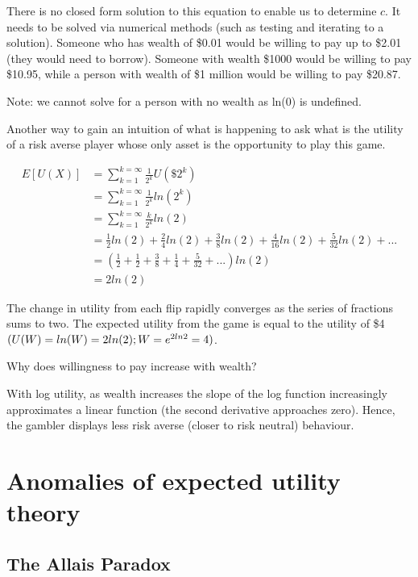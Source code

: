 \documentclass[
  letterpaper,
  DIV=11,
  numbers=noendperiod]{scrreprt}
\begin{document}
There is no closed form solution to this equation to enable us to
determine \(c\). It needs to be solved via numerical methods (such as
testing and iterating to a solution). Someone who has wealth of \$0.01
would be willing to pay up to \$2.01 (they would need to borrow).
Someone with wealth \$1000 would be willing to pay \$10.95, while a
person with wealth of \$1 million would be willing to pay \$20.87.

Note: we cannot solve for a person with no wealth as ln⁡(0) is undefined.

Another way to gain an intuition of what is happening to ask what is the
utility of a risk averse player whose only asset is the opportunity to
play this game.

\begin{align*}
E[U(X)]&=\sum_{k=1}^{k=\infty}\frac{1}{2^k}U(\$2^k) \\[12pt]
&=\sum_{k=1}^{k=\infty}\frac{1}{2^k}ln(2^k) \\[12pt]
&=\sum_{k=1}^{k=\infty}\frac{k}{2^k}ln(2) \\[12pt]
&=\frac{1}{2}ln(2)+\frac{2}{4}ln(2)+\frac{3}{8}ln(2)+\frac{4}{16}ln(2)+\frac{5}{32}ln(2)+... \\[12pt]
&=(\frac{1}{2}+\frac{1}{2}+\frac{3}{8}+\frac{1}{4}+\frac{5}{32}+...)ln(2) \\[12pt]
&=2ln(2)
\end{align*}

The change in utility from each flip rapidly converges as the series of
fractions sums to two. The expected utility from the game is equal to
the utility of \$4 \((U(W)=ln(W)=2ln(2);\space W=e^{2ln2}=4)\).

Why does willingness to pay increase with wealth?

With log utility, as wealth increases the slope of the log function
increasingly approximates a linear function (the second derivative
approaches zero). Hence, the gambler displays less risk averse (closer
to risk neutral) behaviour.

\hypertarget{anomalies-of-expected-utility-theory}{%
\chapter{Anomalies of expected utility
theory}\label{anomalies-of-expected-utility-theory}}

\hypertarget{sec-allais}{%
\section{The Allais Paradox}\label{sec-allais}}
\end{document}
